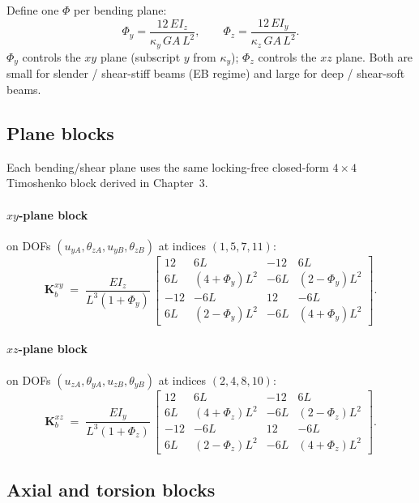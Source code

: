 \documentclass[11pt,a4paper]{article}
\newcommand{\bmath}[1]{\boldsymbol{#1}}
\begin{document}
Define one $\Phi$ per bending plane:
\[
\boxed{\;\Phi_y = \dfrac{12\,E I_z}{\kappa_y\,GA\,L^2}, \qquad
        \Phi_z = \dfrac{12\,E I_y}{\kappa_z\,GA\,L^2}.\;}
\]
$\Phi_y$ controls the $xy$ plane (subscript $y$ from $\kappa_y$); $\Phi_z$ controls the $xz$ plane. Both are small for slender / shear-stiff beams (EB regime) and large for deep / shear-soft beams.

\subsection{Plane blocks}

Each bending/shear plane uses the same locking-free closed-form $4\times 4$ Timoshenko block derived in Chapter~3.

\paragraph{$xy$-plane block} on DOFs $(u_{yA}, \theta_{zA}, u_{yB}, \theta_{zB})$ at indices $(1, 5, 7, 11)$:
\[
\bmath{K}_b^{xy} \;=\; \dfrac{E I_z}{L^3(1+\Phi_y)}\,
\begin{bmatrix}
12     & 6L            & -12    & 6L           \\
6L     & (4+\Phi_y)L^2 & -6L    & (2-\Phi_y)L^2 \\
-12    & -6L           & 12     & -6L          \\
6L     & (2-\Phi_y)L^2 & -6L    & (4+\Phi_y)L^2
\end{bmatrix}.
\]

\paragraph{$xz$-plane block} on DOFs $(u_{zA}, \theta_{yA}, u_{zB}, \theta_{yB})$ at indices $(2, 4, 8, 10)$:
\[
\bmath{K}_b^{xz} \;=\; \dfrac{E I_y}{L^3(1+\Phi_z)}\,
\begin{bmatrix}
12     & 6L            & -12    & 6L           \\
6L     & (4+\Phi_z)L^2 & -6L    & (2-\Phi_z)L^2 \\
-12    & -6L           & 12     & -6L          \\
6L     & (2-\Phi_z)L^2 & -6L    & (4+\Phi_z)L^2
\end{bmatrix}.
\]

\subsection{Axial and torsion blocks}
\end{document}
